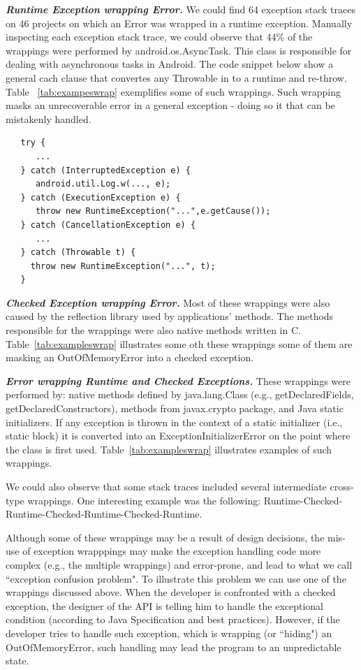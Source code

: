 \documentclass[conference]{IEEEtran}
\begin{document}
\emph{\textbf{Runtime Exception wrapping Error.}} We could find  64 exception stack traces 
on 46 projects on which an Error was wrapped in a runtime exception.
Manually inspecting each exception stack trace, we could observe that 44\% of the wrappings were performed 
by android.os.AsyncTask. This class is responsible for dealing with asynchronous tasks in Android.
The code snippet below show a general cach clause that convertes any Throwable in to a runtime and re-throw.  
Table ~\ref{tab:exampeswrap} exemplifies some of such wrappings.
Such wrapping masks an unrecoverable error in a general exception - doing so it that can be mistakenly handled.

{\footnotesize
\begin{verbatim}
   try {
      ...
   } catch (InterruptedException e) {
      android.util.Log.w(..., e);
   } catch (ExecutionException e) {
      throw new RuntimeException("...",e.getCause());
   } catch (CancellationException e) {
      ...
   } catch (Throwable t) {
     throw new RuntimeException("...", t);
   }
\end{verbatim}
}

\emph{\textbf{Checked Exception wrapping Error.}} Most of these wrappings
 were also caused by the reflection library used by applications' methods. The methods responsible for the wrappings
were also native methods written in C. Table~\ref{tab:exampleswrap} illustrates
some oth these wrappings some of them are masking an OutOfMemoryError
into a checked exception.

\emph{\textbf{Error wrapping Runtime and Checked Exceptions.}} 
These wrappings were performed by: native methods defined by 
java.lang.Class (e.g., getDeclaredFields, getDeclaredConstructors), 
methods from javax.crypto package, and Java static initializers. 
If any exception is thrown in the context of a static initializer 
(i.e., static block)  it is converted into an ExceptionInitializerError 
on the point where the class is first used.  Table~\ref{tab:exampleswrap} illustrates
examples of such wrappings.

We could also observe that some stack traces included several intermediate cross-type wrappings.
One interesting example was the following: Runtime-Checked-Runtime-Checked-Runtime-Checked-Runtime.

Although some of these wrappings may be a result of design decisions,
the mis-use of exception wrapppings may make the exception handling 
code more complex (e.g., the multiple wrappings) and error-prone,
 and lead to what we call ``exception confusion problem". To illustrate this problem we can use one of the wrappings discussed above.
When the developer is confronted with a checked exception, the designer of the API is telling him 
to handle the exceptional condition (according to Java Specification and 
best practices). However, if the developer tries to handle such exception,
which is wrapping (or ``hiding") an OutOfMemoryError, such handling 
may lead the program to an unpredictable state.
\end{document}
